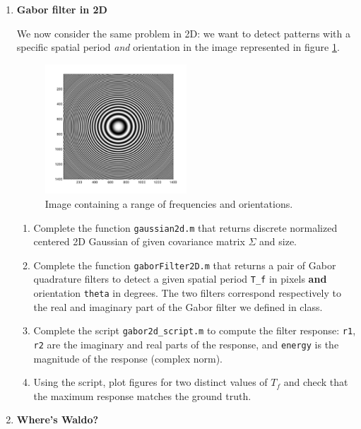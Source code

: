 \begin{enumerate}
\item \textbf{Gabor filter in 2D}

  We now consider the same problem in 2D: we want to detect patterns with a specific spatial period \emph{and} orientation in the image represented in figure \ref{incr_freq_2d}.
    \begin{figure}[ht!]
    \begin{center}
      \includegraphics[width = 0.5\textwidth]{images/incr_freq_2d.pdf}
    \end{center}
    \caption{\label{incr_freq_2d} Image containing a range of frequencies and orientations.}
  \end{figure}

  \begin{enumerate}
  \item {} Complete the function \verb!gaussian2d.m! that returns discrete normalized centered 2D Gaussian of given covariance matrix $\Sigma$ and size.
  \item {} Complete the function \verb!gaborFilter2D.m! that returns a pair of Gabor quadrature filters to detect a given spatial period \verb!T_f! in pixels \textbf{and} orientation \verb!theta! in degrees. The two filters correspond respectively to the real and imaginary part of the Gabor filter we defined in class. 
  \item {} Complete the script \verb!gabor2d_script.m! to compute the filter response: \verb!r1!, \verb!r2! are the imaginary and real parts of the response, and \verb!energy! is the magnitude of the response (complex norm).
  \item {} Using the script, plot figures for two distinct values of $T_f$ and check that the maximum response matches the ground truth.
  \end{enumerate}

\item \textbf{Where's Waldo?}


\end{enumerate}
